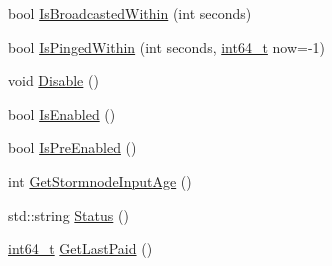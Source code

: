 \begin{DoxyCompactItemize}
\item 
bool \hyperlink{class_c_stormnode_a01713cf27e8c36c1677a5e3bad2674b5}{Is\+Broadcasted\+Within} (int seconds)
\item 
bool \hyperlink{class_c_stormnode_a5f19595c1ccbb539f2d369871671ab70}{Is\+Pinged\+Within} (int seconds, \hyperlink{stdint_8h_adec1df1b8b51cb32b77e5b86fff46471}{int64\+\_\+t} now=-\/1)
\item 
void \hyperlink{class_c_stormnode_ab97bb31f794c0cfd4d740c0a3cc1efbe}{Disable} ()
\item 
bool \hyperlink{class_c_stormnode_a065cd7423a76fab999a3afdcc356ca91}{Is\+Enabled} ()
\item 
bool \hyperlink{class_c_stormnode_adb7b900b9608f2360b9cf97f7b836679}{Is\+Pre\+Enabled} ()
\item 
int \hyperlink{class_c_stormnode_a8a82685a7b1ea42d49e44459b35932fe}{Get\+Stormnode\+Input\+Age} ()
\item 
std\+::string \hyperlink{class_c_stormnode_aa96a9dc4e1c835657fe5d9c8410adf83}{Status} ()
\item 
\hyperlink{stdint_8h_adec1df1b8b51cb32b77e5b86fff46471}{int64\+\_\+t} \hyperlink{class_c_stormnode_a1502f0b0559e139a3100aa5646f95bd7}{Get\+Last\+Paid} ()
\end{DoxyCompactItemize}
